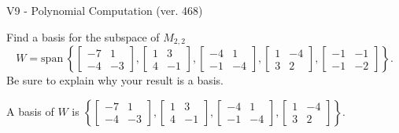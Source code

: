 \begin{exercise}
  \begin{exerciseTitle}V9 - Polynomial Computation (ver. 468)\end{exerciseTitle}
  \begin{exerciseStatement}
    Find a basis for the subspace of \(M_{2,2}\) 
\[W=\mathrm{span}\ \left\{\left[\begin{array}{cc}
-7 & 1 \\
-4 & -3
\end{array}\right] , \left[\begin{array}{cc}
1 & 3 \\
4 & -1
\end{array}\right] , \left[\begin{array}{cc}
-4 & 1 \\
-1 & -4
\end{array}\right] , \left[\begin{array}{cc}
1 & -4 \\
3 & 2
\end{array}\right] , \left[\begin{array}{cc}
-1 & -1 \\
-1 & -2
\end{array}\right]\right\}.\]
 Be sure to explain why your result is a basis.


  \end{exerciseStatement}
  \begin{exerciseAnswer}
   A basis of \(W\) is  \(\left\{\left[\begin{array}{cc}
-7 & 1 \\
-4 & -3
\end{array}\right] , \left[\begin{array}{cc}
1 & 3 \\
4 & -1
\end{array}\right] , \left[\begin{array}{cc}
-4 & 1 \\
-1 & -4
\end{array}\right] , \left[\begin{array}{cc}
1 & -4 \\
3 & 2
\end{array}\right]\right\}\).
  


  \end{exerciseAnswer}
\end{exercise}